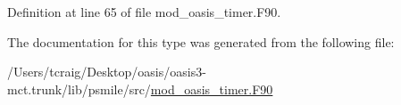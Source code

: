 Definition at line 65 of file mod\+\_\+oasis\+\_\+timer.\+F90.



The documentation for this type was generated from the following file\+:\begin{DoxyCompactItemize}
\item 
/\+Users/tcraig/\+Desktop/oasis/oasis3-\/mct.\+trunk/lib/psmile/src/\hyperlink{mod__oasis__timer_8_f90}{mod\+\_\+oasis\+\_\+timer.\+F90}\end{DoxyCompactItemize}
